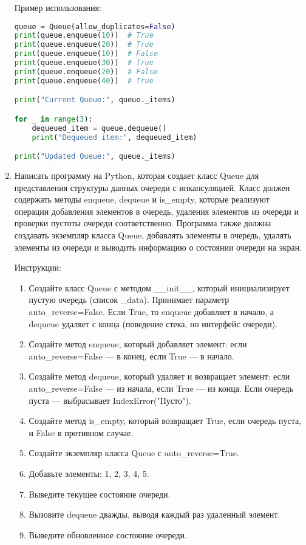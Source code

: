 \begin{enumerate}
Пример использования:
\begin{lstlisting}[language=Python]
queue = Queue(allow_duplicates=False)
print(queue.enqueue(10))  # True
print(queue.enqueue(20))  # True
print(queue.enqueue(10))  # False
print(queue.enqueue(30))  # True
print(queue.enqueue(20))  # False
print(queue.enqueue(40))  # True

print("Current Queue:", queue._items)

for _ in range(3):
    dequeued_item = queue.dequeue()
    print("Dequeued item:", dequeued_item)

print("Updated Queue:", queue._items)
\end{lstlisting}

\item Написать программу на Python, которая создает класс Queue для представления структуры данных очереди с инкапсуляцией. Класс должен содержать методы enqueue, dequeue и is\_empty, которые реализуют операции добавления элементов в очередь, удаления элементов из очереди и проверки пустоты очереди соответственно. Программа также должна создавать экземпляр класса Queue, добавлять элементы в очередь, удалять элементы из очереди и выводить информацию о состоянии очереди на экран.

Инструкции:
\begin{enumerate}
    \item Создайте класс Queue с методом \_\_init\_\_, который инициализирует пустую очередь (список \_data). Принимает параметр auto\_reverse=False. Если True, то enqueue добавляет в начало, а dequeue удаляет с конца (поведение стека, но интерфейс очереди).
    \item Создайте метод enqueue, который добавляет элемент: если auto\_reverse=False — в конец, если True — в начало.
    \item Создайте метод dequeue, который удаляет и возвращает элемент: если auto\_reverse=False — из начала, если True — из конца. Если очередь пуста — выбрасывает IndexError("Пусто").
    \item Создайте метод is\_empty, который возвращает True, если очередь пуста, и False в противном случае.
    \item Создайте экземпляр класса Queue с auto\_reverse=True.
    \item Добавьте элементы: 1, 2, 3, 4, 5.
    \item Выведите текущее состояние очереди.
    \item Вызовите dequeue дважды, выводя каждый раз удаленный элемент.
    \item Выведите обновленное состояние очереди.
\end{enumerate}


\end{enumerate}
